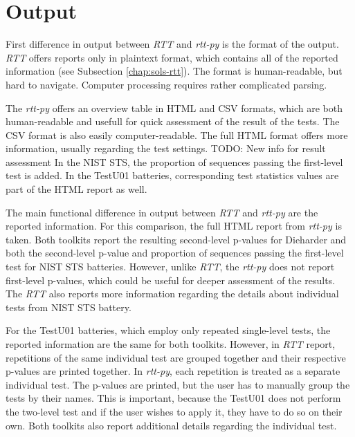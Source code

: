 \documentclass[
  digital,     %
  oneside,     %
  nosansbold,  %
  nocolorbold, %
  nolof,         %
  nolot,         %
]{fithesis4}
\begin{document}
\section{Output}
First difference in output between \emph{RTT} and \emph{rtt-py} is the format of the output. \emph{RTT} offers reports only in plaintext format, which contains all of the reported information (see Subsection \ref{chap:sols-rtt}). The format is human-readable, but hard to navigate. Computer processing requires rather complicated parsing.

The \emph{rtt-py} offers an overview table in HTML and CSV formats, which are both human-readable and usefull for quick assessment of the result of the tests. The CSV format is also easily computer-readable. The full HTML format offers more information, usually regarding the test settings. TODO: New info for result assessment In the NIST STS, the proportion of sequences passing the first-level test is added. In the TestU01 batteries, corresponding test statistics values are part of the HTML report as well.

The main functional difference in output between \emph{RTT} and \emph{rtt-py} are the reported information. For this comparison, the full HTML report from \emph{rtt-py} is taken. Both toolkits report the resulting second-level p-values for Dieharder and both the second-level p-value and proportion of sequences passing the first-level test for NIST STS batteries. However, unlike \emph{RTT}, the \emph{rtt-py} does not report first-level p-values, which could be useful for deeper assessment of the results. The \emph{RTT} also reports more information regarding the details about individual tests from NIST STS battery.


For the TestU01 batteries, which employ only repeated single-level tests, the reported information are the same for both toolkits. However, in \emph{RTT} report, repetitions of the same individual test are grouped together and their respective p-values are printed together. In \emph{rtt-py}, each repetition is treated as a separate individual test. The p-values are printed, but the user has to manually group the tests by their names. This is important, because the TestU01 does not perform the two-level test and if the user wishes to apply it, they have to do so on their own. Both toolkits also report additional details regarding the individual test.



\end{document}
